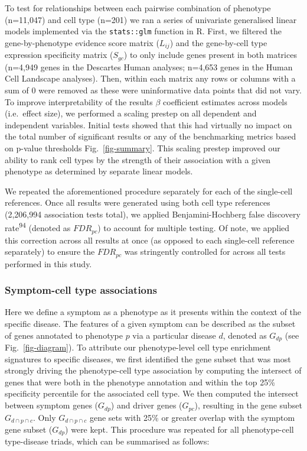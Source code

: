 \documentclass[
]{article}
\begin{document}
To test for relationships between each pairwise combination of phenotype
(n=11,047) and cell type (n=201) we ran a series of univariate
generalised linear models implemented via the \texttt{stats::glm}
function in R. First, we filtered the gene-by-phenotype evidence score
matrix (\(L_{ij}\)) and the gene-by-cell type expression specificity
matrix (\(S_{gc}\)) to only include genes present in both matrices
(n=4,949 genes in the Descartes Human analyses; n=4,653 genes in the
Human Cell Landscape analyses). Then, within each matrix any rows or
columns with a sum of 0 were removed as these were uninformative data
points that did not vary. To improve interpretability of the results
\(\beta\) coefficient estimates across models (i.e.~effect size), we
performed a scaling prestep on all dependent and independent variables.
Initial tests showed that this had virtually no impact on the total
number of significant results or any of the benchmarking metrics based
on p-value thresholds Fig.~\ref{fig-summary}. This scaling prestep
improved our ability to rank cell types by the strength of their
association with a given phenotype as determined by separate linear
models.

We repeated the aforementioned procedure separately for each of the
single-cell references. Once all results were generated using both cell
type references (2,206,994 association tests total), we applied
Benjamini-Hochberg false discovery rate\textsuperscript{94} (denoted as
\(FDR_{pc}\)) to account for multiple testing. Of note, we applied this
correction across all results at once (as opposed to each single-cell
reference separately) to ensure the \(FDR_{pc}\) was stringently
controlled for across all tests performed in this study.

\subsubsection{Symptom-cell type
associations}\label{symptom-cell-type-associations}

Here we define a symptom as a phenotype as it presents within the
context of the specific disease. The features of a given symptom can be
described as the subset of genes annotated to phenotype \(p\) via a
particular disease \(d\), denoted as \(G_{dp}\) (see
Fig.~\ref{fig-diagram}). To attribute our phenotype-level cell type
enrichment signatures to specific diseases, we first identified the gene
subset that was most strongly driving the phenotype-cell type
association by computing the intersect of genes that were both in the
phenotype annotation and within the top 25\% specificity percentile for
the associated cell type. We then computed the intersect between symptom
genes (\(G_{dp}\)) and driver genes (\(G_{pc}\)), resulting in the gene
subset \(G_{d \cap p \cap c}\). Only \(G_{d \cap p \cap c}\) gene sets
with 25\% or greater overlap with the symptom gene subset (\(G_{dp}\))
were kept. This procedure was repeated for all phenotype-cell
type-disease triads, which can be summarised as follows:
\end{document}
